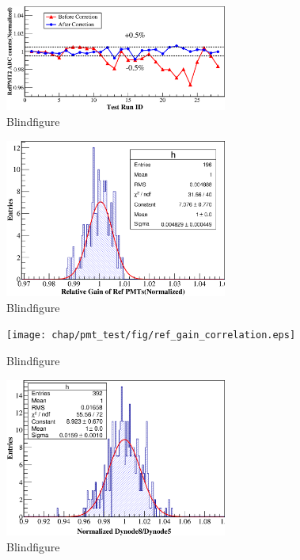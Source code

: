 \begin{figure}[htbp]
	\centering
	\includegraphics[width=0.65\textwidth]{chap/pmt_test/fig/led_stability.eps}
	\caption{Blindfigure}
	\label{fig:blindfigure}
\end{figure}

\begin{figure}[htbp]
	\centering
	\includegraphics[width=0.65\textwidth]{chap/pmt_test/fig/ref_gain_stability.eps}
	\caption{Blindfigure}
	\label{fig:blindfigure}
\end{figure}

\begin{figure}[htbp]
	\centering
	\texttt{[image: chap/pmt\_test/fig/ref\_gain\_correlation.eps]}
	\caption{Blindfigure}
	\label{fig:blindfigure}
\end{figure}

\begin{figure}[htbp]
	\centering
	\includegraphics[width=0.65\textwidth]{chap/pmt_test/fig/ref_dy58_stability.eps}
	\caption{Blindfigure}
	\label{fig:blindfigure}
\end{figure}